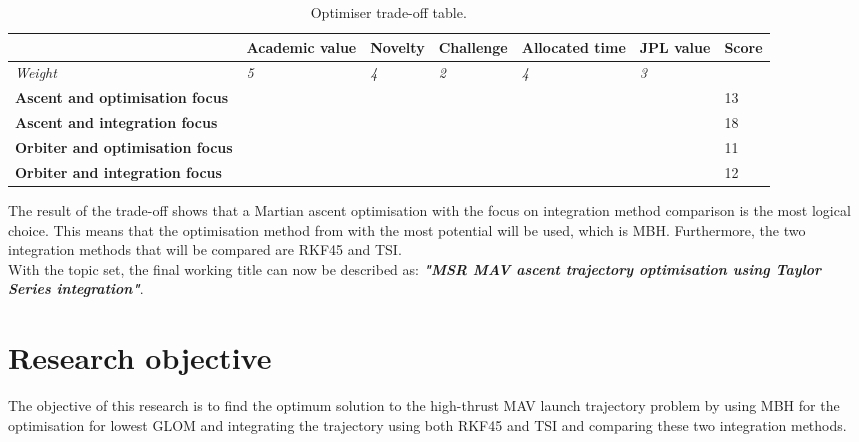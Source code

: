 \begin{table}[!ht]
\begin{center}
\caption{Optimiser trade-off table.}
\label{tab:fin_trade_off}
\begin{tabular}{|p{3cm}||l|l|l|l|l||l|}
\hline 
 &	\textbf{Academic value} & \textbf{Novelty} & \textbf{Challenge} & \textbf{Allocated time} & \textbf{\ac{JPL} value} & \textbf{Score} \\ \hline 
\textit{Weight} & \textit{5} & \textit{4} & \textit{2} & \textit{4} & \textit{3} & \\ \hline \hline
\textbf{Ascent and optimisation focus} & \cellcolor{yellow} & \cellcolor{green} & \cellcolor{yellow} & \cellcolor{green} & \cellcolor{yellow} & 13 \\ \hline
\textbf{Ascent and integration focus} & \cellcolor{green} & \cellcolor{green} & \cellcolor{green} & \cellcolor{green} & \cellcolor{yellow} &  18 \\ \hline
\textbf{Orbiter and optimisation focus} & \cellcolor{green} & \cellcolor{red} & \cellcolor{yellow} & \cellcolor{yellow} & \cellcolor{green} & 11  \\ \hline
\textbf{Orbiter and integration focus} & \cellcolor{green} & \cellcolor{yellow} & \cellcolor{green} & \cellcolor{red} & \cellcolor{green} & 12 \\ \hline

\end{tabular}
\end{center}
\end{table}

The result of the trade-off shows that a Martian ascent optimisation with the focus on integration method comparison is the most logical choice. This means that the optimisation method from  with the most potential will be used, which is \ac{MBH}. Furthermore, the two integration methods that will be compared are \ac{RKF45} and \ac{TSI}. \\
With the topic set, the final working title can now be described as: \textbf{\textit{"\acl{MSR} \ac{MAV} ascent trajectory optimisation using Taylor Series integration"}}. 

\section{Research objective}
\label{sec:resobj_fin}
The objective of this research is to find the optimum solution to the high-thrust \ac{MAV} launch trajectory problem by using \ac{MBH} for the optimisation for lowest \ac{GLOM} and integrating the trajectory using both \ac{RKF45} and \ac{TSI} and comparing these two integration methods.

